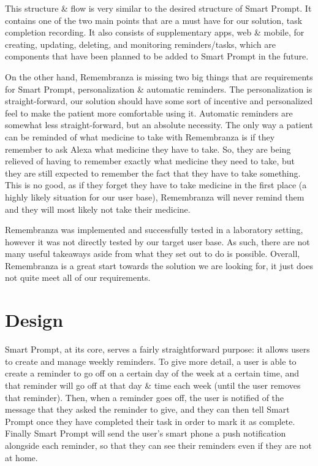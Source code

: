 \documentclass[11pt, oneside]{article}
\begin{document}
This structure \& flow is very similar to the desired structure of Smart Prompt. 
It contains one of the two main points that are a must have for our solution, task completion recording. 
It also consists of supplementary apps, web \& mobile, for creating, updating, deleting, and monitoring reminders/tasks, which are components that have been planned to be added to Smart Prompt in the future. 

On the other hand, Remembranza is missing two big things that are requirements for Smart Prompt, personalization \& automatic reminders. 
The personalization is straight-forward, our solution should have some sort of incentive and personalized feel to make the patient more comfortable using it. 
Automatic reminders are somewhat less straight-forward, but an absolute necessity. 
The only way a patient can be reminded of what medicine to take with Remembranza is if they remember to ask Alexa what medicine they have to take. 
So, they are being relieved of having to remember exactly what medicine they need to take, but they are still expected to remember the fact that they have to take something. 
This is no good, as if they forget they have to take medicine in the first place (a highly likely situation for our user base), Remembranza will never remind them and they will most likely not take their medicine. 

Remembranza was implemented and successfully tested in a laboratory setting, however it was not directly tested by our target user base. 
As such, there are not many useful takeaways aside from what they set out to do is possible. 
Overall, Remembranza is a great start towards the solution we are looking for, it just does not quite meet all of our requirements. 


\section{Design}

Smart Prompt, at its core, serves a fairly straightforward purpose: it allows users to create and manage weekly reminders. 
To give more detail, a user is able to create a reminder to go off on a certain day of the week at a certain time, and that reminder will go off at that day \& time each week (until the user removes that reminder). 
Then, when a reminder goes off, the user is notified of the message that they asked the reminder to give, and they can then tell Smart Prompt once they have completed their task in order to mark it as complete. 
Finally Smart Prompt will send the user's smart phone a push notification alongside each reminder, so that they can see their reminders even if they are not at home. 
\end{document}
